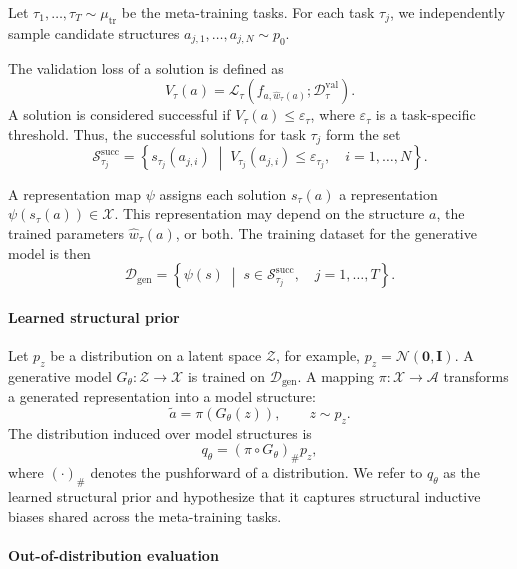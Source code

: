 Let $\tau_1,\ldots,\tau_T\sim\mu_{\mathrm{tr}}$ be the meta-training tasks.
For each task $\tau_j$, we independently sample candidate structures
$a_{j,1},\ldots,a_{j,N}\sim p_0$.

The validation loss of a solution is defined as
\[
V_\tau(a)
=
\mathcal{L}_\tau\!\left(
  f_{a,\widehat{w}_\tau(a)};
  \mathcal{D}^{\mathrm{val}}_\tau
\right).
\]
A solution is considered successful if
$V_\tau(a)\leq\varepsilon_\tau$, where $\varepsilon_\tau$ is a
task-specific threshold. Thus, the successful solutions for task $\tau_j$
form the set
\[
\mathcal{S}^{\mathrm{succ}}_{\tau_j}
=
\left\{
  s_{\tau_j}(a_{j,i})
  \;\middle|\;
  V_{\tau_j}(a_{j,i})\leq\varepsilon_{\tau_j},
  \quad i=1,\ldots,N
\right\}.
\]

A representation map $\psi$ assigns each solution $s_\tau(a)$ a
representation $\psi(s_\tau(a))\in\mathcal{X}$. This representation may
depend on the structure $a$, the trained parameters $\widehat{w}_\tau(a)$,
or both. The training dataset for the generative model is then
\[
\mathcal{D}_{\mathrm{gen}}
=
\left\{
  \psi(s)
  \;\middle|\;
  s\in\mathcal{S}^{\mathrm{succ}}_{\tau_j},
  \quad j=1,\ldots,T
\right\}.
\]

\paragraph*{Learned structural prior}

Let $p_z$ be a distribution on a latent space $\mathcal{Z}$, for example,
$p_z=\mathcal{N}(\mathbf{0},\mathbf{I})$. A generative model
$G_\theta:\mathcal{Z}\rightarrow\mathcal{X}$ is trained on
$\mathcal{D}_{\mathrm{gen}}$. A mapping
$\pi:\mathcal{X}\rightarrow\mathcal{A}$ transforms a generated
representation into a model structure:
\[
\widetilde{a}=\pi\!\left(G_\theta(z)\right),
\qquad z\sim p_z.
\]
The distribution induced over model structures is
\[
q_\theta=\left(\pi\circ G_\theta\right)_{\#}p_z,
\]
where $(\cdot)_{\#}$ denotes the pushforward of a distribution. We refer to
$q_\theta$ as the learned structural prior and hypothesize that it captures
structural inductive biases shared across the meta-training tasks.

\paragraph*{Out-of-distribution evaluation}

